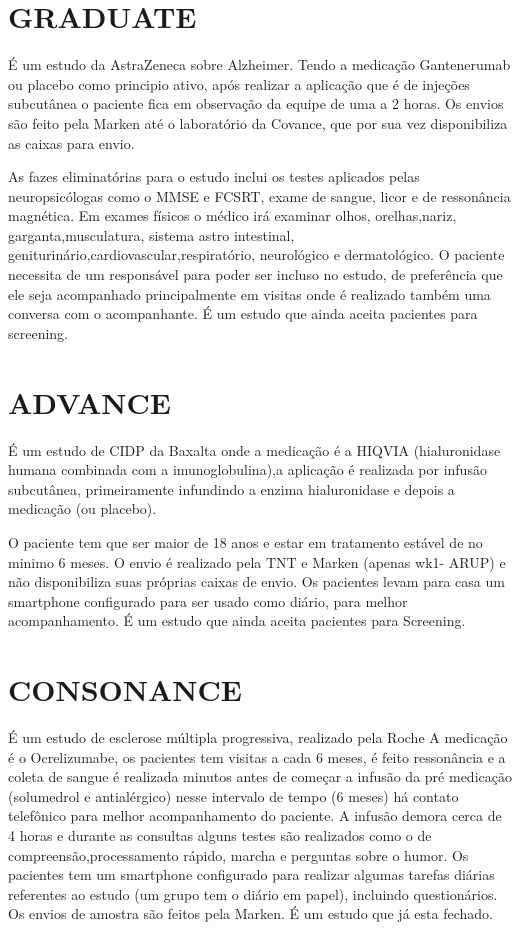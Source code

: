 \section{GRADUATE}

É  um estudo da AstraZeneca sobre Alzheimer. Tendo a medicação Gantenerumab ou placebo como principio ativo, após realizar a aplicação que é de injeções subcutânea o paciente fica em observação da equipe de uma a 2 horas.  Os envios são feito pela Marken até o laboratório da Covance, que por sua vez disponibiliza as caixas para envio. 

As fazes eliminatórias para o estudo inclui os testes aplicados pelas neuropsicólogas como o MMSE e FCSRT, exame de sangue, licor e de ressonância magnética. Em exames físicos o médico irá examinar olhos, orelhas,nariz, garganta,musculatura, sistema astro intestinal, geniturinário,cardiovascular,respiratório, neurológico e dermatológico. O paciente necessita de um responsável para poder ser incluso no estudo, de preferência que ele seja acompanhado principalmente em visitas onde é realizado também uma conversa com o acompanhante. É um estudo que ainda aceita pacientes para screening. 

\section{ADVANCE}

É um estudo de CIDP da Baxalta onde a medicação é a HIQVIA (hialuronidase humana combinada com a imunoglobulina),a aplicação é realizada por infusão subcutânea, primeiramente infundindo a enzima hialuronidase e depois a medicação (ou placebo). 

O paciente tem que ser maior de 18 anos e estar em tratamento estável de no minimo 6 meses. O envio é realizado pela TNT e Marken (apenas wk1- ARUP) e não disponibiliza suas próprias caixas de envio. Os pacientes levam para casa um smartphone configurado para ser usado como diário, para melhor acompanhamento.  É um estudo que ainda aceita pacientes para Screening. 

\section{CONSONANCE}

É um estudo de esclerose múltipla progressiva, realizado pela Roche A medicação é o Ocrelizumabe, os pacientes tem visitas a cada 6 meses, é feito ressonância e a coleta de sangue é realizada minutos antes de começar a infusão da pré medicação (solumedrol e antialérgico) nesse intervalo de tempo (6 meses) há contato telefônico para melhor acompanhamento do paciente. A infusão demora cerca de 4 horas e durante as consultas alguns testes são realizados como o de compreensão,processamento rápido, marcha e perguntas sobre o humor. Os pacientes tem um smartphone configurado para realizar algumas tarefas diárias referentes ao estudo (um grupo tem o diário em papel), incluindo questionários. Os envios de amostra são feitos pela Marken.  É um estudo que já esta fechado. 

